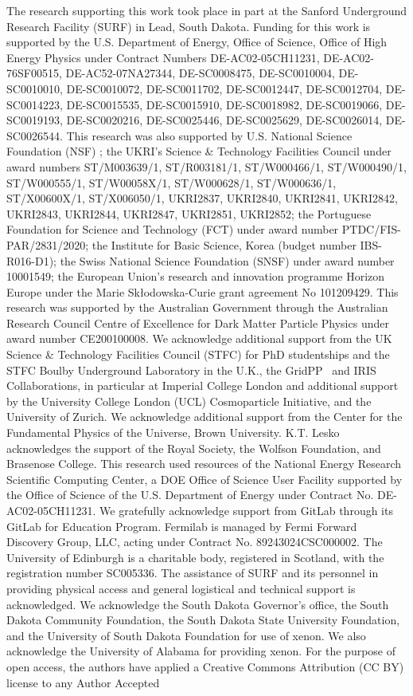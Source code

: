 
The research supporting this work took place in part at the Sanford Underground Research Facility (SURF) in Lead, South Dakota. Funding for this work is supported by the U.S. Department of Energy, Office of Science, Office of High Energy Physics under Contract Numbers DE-AC02-05CH11231, DE-AC02-76SF00515, DE-AC52-07NA27344, DE-SC0008475, DE-SC0010004, DE-SC0010010, DE-SC0010072, DE-SC0011702, DE-SC0012447, DE-SC0012704, DE-SC0014223, DE-SC0015535, DE-SC0015910, DE-SC0018982, DE-SC0019066, DE-SC0019193, DE-SC0020216, DE-SC0025446, DE-SC0025629, DE-SC0026014, DE-SC0026544. This research was also supported by U.S. National Science Foundation (NSF) ; the UKRI’s Science \& Technology Facilities Council under award numbers ST/M003639/1, ST/R003181/1, ST/W000466/1, ST/W000490/1, ST/W000555/1, ST/W00058X/1, ST/W000628/1, ST/W000636/1, ST/X00600X/1, ST/X006050/1, UKRI2837, UKRI2840, UKRI2841, UKRI2842, UKRI2843, UKRI2844, UKRI2847, UKRI2851, UKRI2852; the Portuguese Foundation for Science and Technology (FCT) under award number PTDC/FIS-PAR/2831/2020; the Institute for Basic Science, Korea (budget number IBS-R016-D1); the Swiss National Science Foundation (SNSF) under award number 10001549; the European Union’s research and innovation programme Horizon Europe under the Marie Skłodowska-Curie grant agreement No 101209429. This research was supported by the Australian Government through the Australian Research Council Centre of Excellence for Dark Matter Particle Physics under award number CE200100008. We acknowledge additional support from the UK Science \& Technology Facilities Council (STFC) for PhD studentships and the STFC Boulby Underground Laboratory in the U.K., the GridPP~\cite{faulkner2005gridpp,britton2009gridpp} and IRIS Collaborations, in particular at Imperial College London and additional support by the University College London (UCL) Cosmoparticle Initiative, and the University of Zurich. We acknowledge additional support from the Center for the Fundamental Physics of the Universe, Brown University. K.T. Lesko acknowledges the support of the Royal Society, the Wolfson Foundation, and Brasenose College. This research used resources of the National Energy Research Scientific Computing Center, a DOE Office of Science User Facility supported by the Office of Science of the U.S. Department of Energy under Contract No. DE-AC02-05CH11231. We gratefully acknowledge support from GitLab through its GitLab for Education Program. Fermilab is managed by Fermi Forward Discovery Group, LLC, acting under Contract No. 89243024CSC000002. The University of Edinburgh is a charitable body, registered in Scotland, with the registration number SC005336. The assistance of SURF and its personnel in providing physical access and general logistical and technical support is acknowledged. We acknowledge the South Dakota Governor's office, the South Dakota Community Foundation, the South Dakota State University Foundation, and the University of South Dakota Foundation for use of xenon. We also acknowledge the University of Alabama for providing xenon. For the purpose of open access, the authors have applied a Creative Commons Attribution (CC BY) license to any Author Accepted 